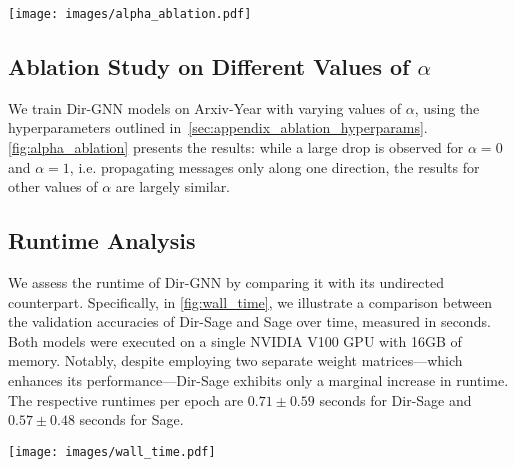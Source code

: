 \documentclass{article}
\newcommand\oursacro{Dir-GNN}
\theoremstyle{plain}
\theoremstyle{definition}
\theoremstyle{remark}
\begin{document}
\begin{figure*}
    \centering
    \texttt{[image: images/alpha\_ablation.pdf]}
    \caption{\oursacro{} test accuracy on Arxiv-Year for different values of the hyperparameter $\alpha$.}
    \label{fig:alpha_ablation}
\end{figure*}

\subsection{Ablation Study on Different Values of \texorpdfstring{$\alpha$}{alpha}}
We train \oursacro{} models on Arxiv-Year with varying values of $\alpha$, using the hyperparameters outlined in~\cref{sec:appendix_ablation_hyperparams}. \cref{fig:alpha_ablation} presents the results: while a large drop is observed for $\alpha=0$ and $\alpha=1$, i.e. propagating messages only along one direction, the results for other values of $\alpha$ are largely similar. 

\subsection{Runtime Analysis}
We assess the runtime of Dir-GNN by comparing it with its undirected counterpart. Specifically, in \cref{fig:wall_time}, we illustrate a comparison between the validation accuracies of Dir-Sage and Sage over time, measured in seconds. Both models were executed on a single NVIDIA V100 GPU  with 16GB of memory. Notably, despite employing two separate weight matrices—which enhances its performance—Dir-Sage exhibits only a marginal increase in runtime. The respective runtimes per epoch are $0.71 \pm 0.59$ seconds for Dir-Sage and $0.57 \pm 0.48$ seconds for Sage.

\begin{figure*}
    \centering
    \texttt{[image: images/wall\_time.pdf]}
    \caption{Validation Accuracy of Dir-Sage and Sage, displayed as a function of time (seconds).}
    \label{fig:wall_time}
\end{figure*}













 
\end{document}

